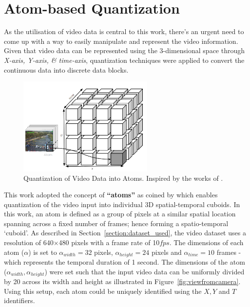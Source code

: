 \section{Atom-based Quantization}
\label{section:atoms}

As the utilisation of video data is central to this work, there's an urgent need to come up with a way to easily manipulate and represent the video information. Given that video data can be represented using the 3-dimensional space through \textit{X-axis, Y-axis, \& time-axis}, quantization techniques were applied to convert the continuous data into discrete data blocks.


\begin{figure}[H]\centering
\includegraphics[width=0.6\textwidth]{image/general/atom.PNG}
\caption[Quantization of Video Data into Atoms.]
{Quantization of Video Data into Atoms.
Inspired by the works of .}
\label{fig:atoms}
\end{figure}


This work adopted the concept of \textbf{``atoms''} as coined by \cite{castanon2016retrieval} which enables quantization of the video input into individual 3D spatial-temporal cuboids. In this work, an atom is defined as a group of pixels at a similar spatial location spanning across a fixed number of frames; hence forming a spatio-temporal `cuboid'.
As described in Section~\ref{section:dataset_used}, the video dataset uses a resolution of 640$\times$480 pixels with a frame rate of 10$fps$.
The dimensions of each atom ($\alpha$) is set to $\alpha_{width}=32$ pixels, $\alpha_{height}=24$ pixels and $\alpha_{time}=10$ frames - which represents the temporal duration of 1 second.
The dimensions of the atom ($\alpha_{width},\alpha_{height}$) were set such that the input video data can be uniformly divided by 20 across its width and height as illustrated in Figure~\ref{fig:viewfromcamera}. Using this setup, each atom could be uniquely identified using the $X, Y$ and $T$ identifiers.

